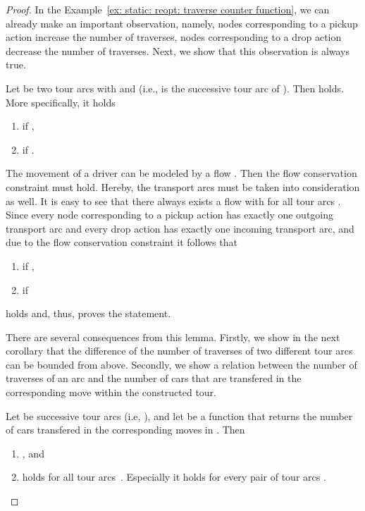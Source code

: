 \documentclass[english]{llncs}
\numberwithin{sublemma}{lemma}
\begin{document}
\begin{proof}


In the Example~\ref{ex: static: reopt: traverse counter function}, we can already make an important observation,
namely, nodes corresponding to a pickup action increase the number of traverses, nodes corresponding to a drop action decrease the number of traverses.
Next, we show that this observation is always true.



\begin{sublemma}
\label{lem: static: reopt: abs diff 1}
Let  be two tour arcs with  and  (i.e.,  is the successive tour arc of ).
Then  holds.
More specifically, it holds
\begin{enumerate}
 \item \label{lem: static: reopt: abs diff 1: 1}  if ,
 \item \label{lem: static: reopt: abs diff 1: 2}  if .
\end{enumerate}
\end{sublemma}



\begin{subproof}
The movement of a driver can be modeled by a flow .
Then the flow conservation constraint  must hold.
Hereby, the transport arcs must be taken into consideration as well.
It is easy to see that there always exists a flow  with  for all tour arcs .
Since every node corresponding to a pickup action has exactly one outgoing transport arc and every drop action has exactly one incoming transport arc,
and due to the flow conservation constraint it follows that
\begin{enumerate}
 \item  if ,
 \item  if 
\end{enumerate}
holds and, thus, proves the statement.
\end{subproof}



There are several consequences from this lemma.
Firstly, we show in the next corollary that the difference of the number of traverses of two different tour arcs can be bounded from above.
Secondly, we show a relation between the number of traverses of an arc and the number of cars that are transfered in the corresponding move within the constructed tour.


\begin{sublemma}
\label{cor: static: reopt: leq C}
Let  be successive tour arcs (i.e, ), and
let  be a function that returns the number of cars transfered in the corresponding moves in .
Then
\begin{enumerate}
 \item \label{cor: static: reopt: leq C: 1} , and
 \item \label{cor: static: reopt: leq C: 2}  holds for all tour arcs~.
  Especially it holds  for every pair of tour arcs .
\end{enumerate}
\end{sublemma}




\end{proof}
\end{document}

